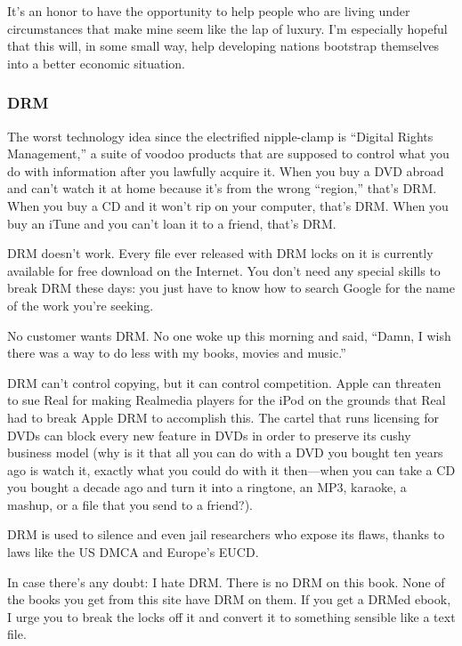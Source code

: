 It's an honor to have the opportunity to help people who are living
under circumstances that make mine seem like the lap of luxury.  I'm
especially hopeful that this will, in some small way, help developing
nations bootstrap themselves into a better economic situation.


\subsubsection{DRM}

The worst technology idea since the electrified nipple-clamp is
``Digital Rights Management,'' a suite of voodoo products that are
supposed to control what you do with information after you lawfully
acquire it.  When you buy a DVD abroad and can't watch it at home
because it's from the wrong ``region,'' that's DRM.  When you buy a CD
and it won't rip on your computer, that's DRM.  When you buy an iTune
and you can't loan it to a friend, that's DRM.

DRM doesn't work.  Every file ever released with DRM locks on it is
currently available for free download on the Internet.  You don't need
any special skills to break DRM these days:  you just have to know how
to search Google for the name of the work you're seeking.

No customer wants DRM.  No one woke up this morning and said, ``Damn,
I wish there was a way to do less with my books, movies and music.''

DRM can't control copying, but it can control competition.  Apple can
threaten to sue Real for making Realmedia players for the iPod on the
grounds that Real had to break Apple DRM to accomplish this.  The
cartel that runs licensing for DVDs can block every new feature in
DVDs in order to preserve its cushy business model (why is it that all
you can do with a DVD you bought ten years ago is watch it, exactly
what you could do with it then---when you can take a CD you bought a
decade ago and turn it into a ringtone, an MP3, karaoke, a mashup, or
a file that you send to a friend?).

DRM is used to silence and even jail researchers who expose its flaws,
thanks to laws like the US DMCA and Europe's EUCD. 

In case there's any doubt:  I hate DRM.  There is no DRM on this book. 
None of the books you get from this site have DRM on them.  If you get
a DRMed ebook, I urge you to break the locks off it and convert it to
something sensible like a text file. 

